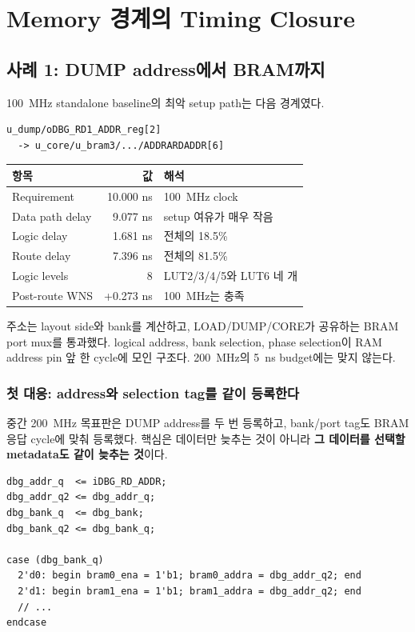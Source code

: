 \chapter{Memory 경계의 Timing Closure}

\section{사례 1: DUMP address에서 BRAM까지}

100~MHz standalone baseline의 최악 setup path는 다음 경계였다.

\begin{lstlisting}[numbers=none]
u_dump/oDBG_RD1_ADDR_reg[2]
  -> u_core/u_bram3/.../ADDRARDADDR[6]
\end{lstlisting}

\begin{longtable}{L{38mm}rL{76mm}}
\toprule
항목 & 값 & 해석 \\
\midrule
Requirement & 10.000 ns & 100~MHz clock \\
Data path delay & 9.077 ns & setup 여유가 매우 작음 \\
Logic delay & 1.681 ns & 전체의 18.5\% \\
Route delay & 7.396 ns & 전체의 81.5\% \\
Logic levels & 8 & LUT2/3/4/5와 LUT6 네 개 \\
Post-route WNS & +0.273 ns & 100~MHz는 충족 \\
\bottomrule
\end{longtable}

주소는 layout side와 bank를 계산하고, LOAD/DUMP/CORE가 공유하는 BRAM port mux를
통과했다. logical address, bank selection, phase selection이 RAM address pin 앞
한 cycle에 모인 구조다. 200~MHz의 5~ns budget에는 맞지 않는다.

\subsection{첫 대응: address와 selection tag를 같이 등록한다}

중간 200~MHz 목표판은 DUMP address를 두 번 등록하고, bank/port tag도 BRAM
응답 cycle에 맞춰 등록했다. 핵심은 데이터만 늦추는 것이 아니라 \textbf{그
데이터를 선택할 metadata도 같이 늦추는 것}이다.

\begin{lstlisting}
dbg_addr_q  <= iDBG_RD_ADDR;
dbg_addr_q2 <= dbg_addr_q;
dbg_bank_q  <= dbg_bank;
dbg_bank_q2 <= dbg_bank_q;

case (dbg_bank_q)
  2'd0: begin bram0_ena = 1'b1; bram0_addra = dbg_addr_q2; end
  2'd1: begin bram1_ena = 1'b1; bram1_addra = dbg_addr_q2; end
  // ...
endcase
\end{lstlisting}

